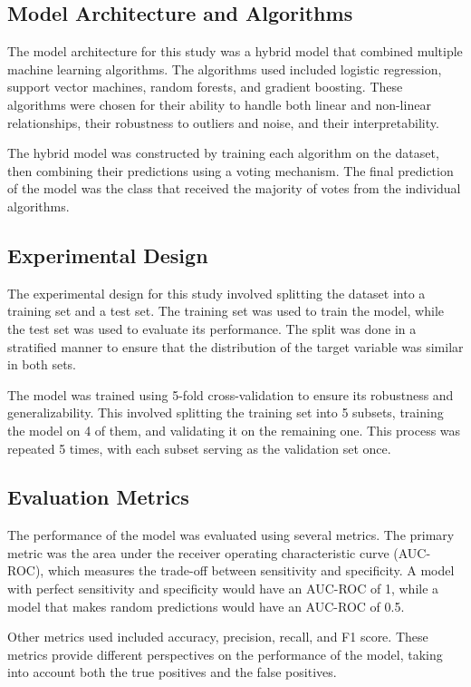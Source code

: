 \documentclass[conference]{IEEEtran}
\begin{document}
\subsection{Model Architecture and Algorithms}
The model architecture for this study was a hybrid model that combined multiple machine learning algorithms. The algorithms used included logistic regression, support vector machines, random forests, and gradient boosting. These algorithms were chosen for their ability to handle both linear and non-linear relationships, their robustness to outliers and noise, and their interpretability.

The hybrid model was constructed by training each algorithm on the dataset, then combining their predictions using a voting mechanism. The final prediction of the model was the class that received the majority of votes from the individual algorithms.

\subsection{Experimental Design}
The experimental design for this study involved splitting the dataset into a training set and a test set. The training set was used to train the model, while the test set was used to evaluate its performance. The split was done in a stratified manner to ensure that the distribution of the target variable was similar in both sets.

The model was trained using 5-fold cross-validation to ensure its robustness and generalizability. This involved splitting the training set into 5 subsets, training the model on 4 of them, and validating it on the remaining one. This process was repeated 5 times, with each subset serving as the validation set once.

\subsection{Evaluation Metrics}
The performance of the model was evaluated using several metrics. The primary metric was the area under the receiver operating characteristic curve (AUC-ROC), which measures the trade-off between sensitivity and specificity. A model with perfect sensitivity and specificity would have an AUC-ROC of 1, while a model that makes random predictions would have an AUC-ROC of 0.5.

Other metrics used included accuracy, precision, recall, and F1 score. These metrics provide different perspectives on the performance of the model, taking into account both the true positives and the false positives.
\end{document}
